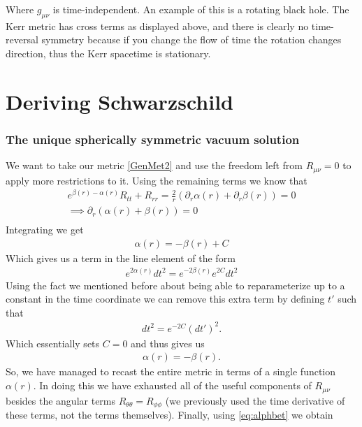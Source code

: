 \documentclass[11pt,table]{article}
\begin{document}
            Where $g_{\mu\nu}$ is time-independent.  An example of this is a rotating black hole.  The Kerr metric has cross terms as displayed above, and there is clearly no time-reversal symmetry because if you change the flow of time the rotation changes direction, thus the Kerr spacetime is stationary.  

\newpage
    \part{Deriving Schwarzschild}
        \section{The unique spherically symmetric vacuum solution}
            We want to take our metric \eqref{GenMet2} and use the freedom left from $R_{\mu\nu}=0$ to apply more restrictions to it.  Using the remaining terms we know that 
            \begin{align*}
                e^{\beta(r)-\alpha(r)}R_{tt}+R_{rr}=\frac{2}{r}(\partial_r\alpha(r)+\partial_r\beta(r))=0\\
                \implies\partial_r(\alpha(r)+\beta(r))=0\\
            \end{align*}
            Integrating we get
            \begin{align}
                \alpha(r)=-\beta(r) + C
            \end{align}
            Which gives us a term in the line element of the form
            \begin{align*}
                e^{2\alpha(r)}dt^2 = e^{-2\beta(r)}e^{2C}dt^2
            \end{align*}
            Using the fact we mentioned before about being able to reparameterize up to a constant in the time coordinate we can remove this extra term by defining $t'$ such that
            \begin{align*}
                dt^2=e^{-2C}(dt')^2.
            \end{align*}
            Which essentially sets $C=0$ and thus gives us
            \begin{align}\label{eq:alphbet}
                \alpha(r)=-\beta(r).
            \end{align}
            So, we have managed to recast the entire metric in terms of a single function $\alpha(r)$.  In doing this we have exhausted all of the useful components of $R_{\mu\nu}$ besides the angular terms $R_{\theta\theta}=R_{\phi\phi}$ (we previously used the time derivative of these terms, not the terms themselves).  Finally, using \eqref{eq:alphbet} we obtain
\end{document}
